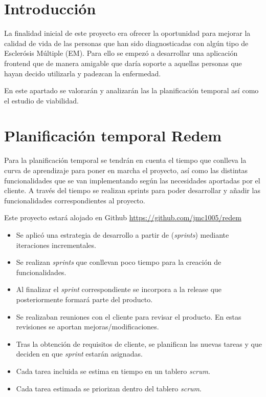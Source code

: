 
\section{Introducción}
La finalidad inicial de este proyecto era ofrecer la oportunidad para mejorar la calidad de vida de las personas que han sido diagnosticadas con algún tipo de Esclerósis Múltiple (EM). Para ello se empezó a desarrollar una aplicación frontend que de manera amigable que daría soporte a aquellas personas que hayan decido utilizarla y padezcan la enfermedad.

En este apartado se valorarán y analizarán las la planificación temporal así como el estudio de viabilidad.

\section{Planificación temporal Redem}
Para la planificación temporal se tendrán en cuenta el tiempo que conlleva la curva de aprendizaje para poner en marcha el proyecto, así como las distintas funcionalidades que se van implementando según las necesidades aportadas por el cliente.
A través del tiempo se realizan sprints para poder desarrollar y añadir las funcionalidades correspondientes al proyecto.

Este proyecto estará alojado en Github \url{https://github.com/jmc1005/redem}

\begin{itemize}
\tightlist
\item Se aplicó una estrategia de desarrollo a partir de (\emph{sprints}) mediante iteraciones incrementales.
\item Se realizan \emph{sprints} que conllevan poco tiempo para la creación de funcionalidades.
\item Al finalizar el \emph{sprint} correspondiente se incorpora a la release que posteriormente formará parte del producto.
\item Se realizaban reuniones con el cliente para revisar el producto. En estas revisiones se aportan mejoras/modificaciones.
\item Tras la obtención de requisitos de cliente, se planifican las nuevas tareas y que deciden en que \emph{sprint} estarán asignadas.
\item Cada tarea incluida se estima en tiempo en un tablero \emph{scrum}.
\item Cada tarea estimada se priorizan dentro del tablero \emph{scrum}.
\end{itemize}

